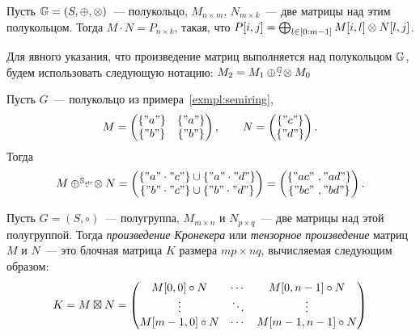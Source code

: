 \begin{definition}
    \label{def:MxM}
    Пусть $\mathbb{G} = (S, \oplus, \otimes)$~--- полукольцо, $M_{n \times m}$, $N_{m\times k}$~--- две матрицы над этим полукольцом.
    Тогда $M \cdot N = P_{n \times k}$, такая, что $P[i, j] = \bigoplus_{l \in [0 \rng m - 1]} M[i, l] \otimes N[l, j]$.
\end{definition}

 Для явного указания, что произведение матриц выполняется над полукольцом $\mathbb{G}$, будем использовать следующую нотацию: $M_2 = M_1 \oplus \! \overset{\mathbb{\mathbb{G}}}{.} \! \otimes M_0$

\begin{example}
    Пусть $G$~--- полукольцо из примера~\ref{exmpl:semiring},
    \[
        M =
        \begin{pmatrix}
            \{"a"\} & \{"a"\} \\
            \{"b"\} & \{"b"\}
        \end{pmatrix},
        \qquad
        N =
        \begin{pmatrix}
            \{"c"\} \\
            \{"d"\}
        \end{pmatrix}.
    \]
    Тогда
    \[
        M \oplus \! \overset{\mathbb{\mathbb{S}_{\mathit{str}}}}{.} \! \otimes N =
        \begin{pmatrix}
            \{"a" \cdot "c"\} \cup \{"a" \cdot "d"\} \\
            \{"b" \cdot "c"\} \cup \{"b" \cdot "d"\}
        \end{pmatrix}=
        \begin{pmatrix}
            \{"ac" \ ,  "ad"\} \\
            \{"bc" \ , "bd"\}
        \end{pmatrix}.
    \]
\end{example}

\begin{definition}
    Пусть $G = (S, \circ)$~--- полугруппа, $M_{m \times n}$ и $N_{p \times q}$~--- две матрицы над этой полугруппой.
    Тогда \emph{произведение Кронекера} или \emph{тензорное произведение} матриц $M$ и $N$~--- это блочная матрица $K$ размера $mp \times nq$, вычисляемая следующим образом:
    \begin{multline*}
        K = M \boxtimes N =
        \begin{pmatrix}
            M[0,0] \circ N  & \cdots & M[0,n-1] \circ N   \\
            \vdots           & \ddots & \vdots             \\
            M[m-1,0] \circ N & \cdots & M[m-1,n-1] \circ N
        \end{pmatrix}
    \end{multline*}
\end{definition}


